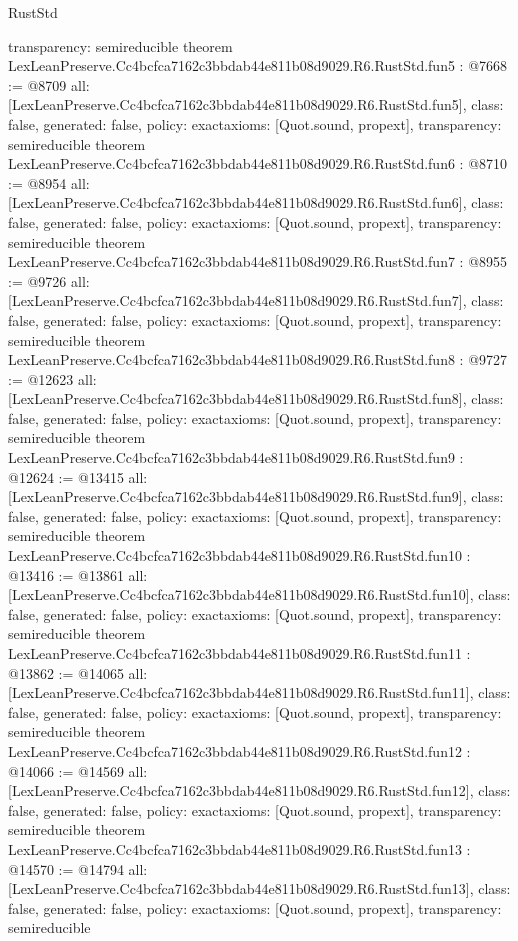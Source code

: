\begin{lexlean}{RustStd}
\begin{coremodule}
{  transparency: semireducible
}
theorem LexLeanPreserve.Cc4bcfca7162c3bbdab44e811b08d9029.R6.RustStd.fun5 : @7668 := @8709 {
  all: [LexLeanPreserve.Cc4bcfca7162c3bbdab44e811b08d9029.R6.RustStd.fun5],
  class: false,
  generated: false,
  policy: exact{axioms: [Quot.sound, propext]},
  transparency: semireducible
}
theorem LexLeanPreserve.Cc4bcfca7162c3bbdab44e811b08d9029.R6.RustStd.fun6 : @8710 := @8954 {
  all: [LexLeanPreserve.Cc4bcfca7162c3bbdab44e811b08d9029.R6.RustStd.fun6],
  class: false,
  generated: false,
  policy: exact{axioms: [Quot.sound, propext]},
  transparency: semireducible
}
theorem LexLeanPreserve.Cc4bcfca7162c3bbdab44e811b08d9029.R6.RustStd.fun7 : @8955 := @9726 {
  all: [LexLeanPreserve.Cc4bcfca7162c3bbdab44e811b08d9029.R6.RustStd.fun7],
  class: false,
  generated: false,
  policy: exact{axioms: [Quot.sound, propext]},
  transparency: semireducible
}
theorem LexLeanPreserve.Cc4bcfca7162c3bbdab44e811b08d9029.R6.RustStd.fun8 : @9727 := @12623 {
  all: [LexLeanPreserve.Cc4bcfca7162c3bbdab44e811b08d9029.R6.RustStd.fun8],
  class: false,
  generated: false,
  policy: exact{axioms: [Quot.sound, propext]},
  transparency: semireducible
}
theorem LexLeanPreserve.Cc4bcfca7162c3bbdab44e811b08d9029.R6.RustStd.fun9 : @12624 := @13415 {
  all: [LexLeanPreserve.Cc4bcfca7162c3bbdab44e811b08d9029.R6.RustStd.fun9],
  class: false,
  generated: false,
  policy: exact{axioms: [Quot.sound, propext]},
  transparency: semireducible
}
theorem LexLeanPreserve.Cc4bcfca7162c3bbdab44e811b08d9029.R6.RustStd.fun10 : @13416 := @13861 {
  all: [LexLeanPreserve.Cc4bcfca7162c3bbdab44e811b08d9029.R6.RustStd.fun10],
  class: false,
  generated: false,
  policy: exact{axioms: [Quot.sound, propext]},
  transparency: semireducible
}
theorem LexLeanPreserve.Cc4bcfca7162c3bbdab44e811b08d9029.R6.RustStd.fun11 : @13862 := @14065 {
  all: [LexLeanPreserve.Cc4bcfca7162c3bbdab44e811b08d9029.R6.RustStd.fun11],
  class: false,
  generated: false,
  policy: exact{axioms: [Quot.sound, propext]},
  transparency: semireducible
}
theorem LexLeanPreserve.Cc4bcfca7162c3bbdab44e811b08d9029.R6.RustStd.fun12 : @14066 := @14569 {
  all: [LexLeanPreserve.Cc4bcfca7162c3bbdab44e811b08d9029.R6.RustStd.fun12],
  class: false,
  generated: false,
  policy: exact{axioms: [Quot.sound, propext]},
  transparency: semireducible
}
theorem LexLeanPreserve.Cc4bcfca7162c3bbdab44e811b08d9029.R6.RustStd.fun13 : @14570 := @14794 {
  all: [LexLeanPreserve.Cc4bcfca7162c3bbdab44e811b08d9029.R6.RustStd.fun13],
  class: false,
  generated: false,
  policy: exact{axioms: [Quot.sound, propext]},
  transparency: semireducible
}
\end{coremodule}
\end{lexlean}
